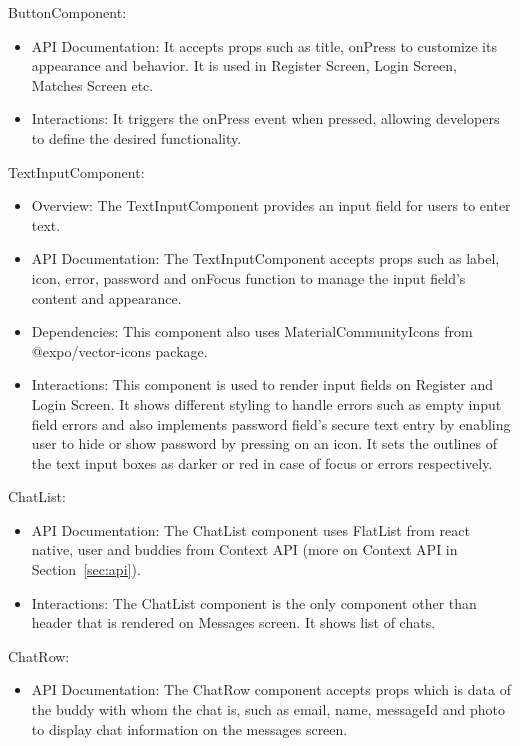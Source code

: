 \begin{compactenum}
    \item ButtonComponent:
    \begin{itemize}
        \item API Documentation: It accepts props such as title, onPress to customize its appearance and behavior. It is used in Register Screen, Login Screen, Matches Screen etc.
        \item Interactions: It triggers the onPress event when pressed, allowing developers to define the desired functionality. 
    \end{itemize}
    \item TextInputComponent:
    \begin{itemize}
        \item Overview: The TextInputComponent provides an input field for users to enter text.
        \item API Documentation: The TextInputComponent accepts props such as label, icon, error, password and onFocus function to manage the input field's content and appearance.
        \item Dependencies: This component also uses MaterialCommunityIcons from @expo/vector-icons package.
        \item Interactions: This component is used to render input fields on Register and Login Screen. It shows different styling to handle errors such as empty input field errors and also implements password field's secure text entry by enabling user to hide or show password by pressing on an icon. It sets the outlines of the text input boxes as darker or red in case of focus or errors respectively. 
    \end{itemize}
    \item ChatList:
    \begin{itemize}
        \item API Documentation: The ChatList component uses FlatList from react native, user and buddies from Context API (more on Context API in Section~\ref{sec:api}).
        \item Interactions: The ChatList component is the only component other than header that is rendered on Messages screen. It shows list of chats.
    \end{itemize}
    \item ChatRow:
    \begin{itemize}
        \item API Documentation: The ChatRow component accepts props which is data of the buddy with whom the chat is, such as email, name, messageId and photo to display chat information on the messages screen.

\end{itemize}
\end{compactenum}
